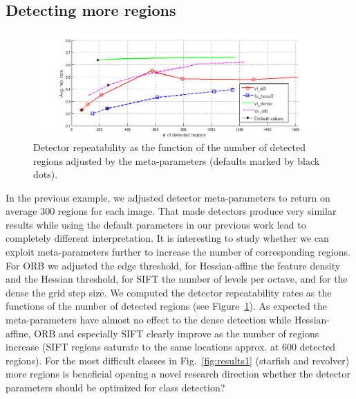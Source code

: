 \documentclass[review]{elsarticle}
\begin{document}
\subsection{Detecting more regions\label{sec:more_regions}}
%
\begin{figure}[h]
  \begin{center}
    \includegraphics[trim=60 0 40 0, clip=true, width=0.8\linewidth]{resources/antti_results/DetectingMoreRegions/DetectorPlot.png}
    \caption{Detector repeatability as the function of the number of
      detected regions adjusted by the meta-parameters (defaults
      marked by black dots).\label{fig:more_regions}}
  \end{center}
\end{figure}
%
In the previous example, we adjusted detector meta-parameters to
return on average 300 regions for each image. That made detectors
produce very similar results while using the default parameters in
our previous work lead to completely different interpretation. 
It is interesting to study whether we can exploit meta-parameters
further to increase the number of corresponding regions.
For ORB we adjusted the edge threshold, for
Hessian-affine the feature density and the Hessian threshold,
for SIFT the number of levels per octave, and for the dense
the grid step size.
We computed the detector repeatability rates as the functions of the
number of detected regions (see Figure~\ref{fig:more_regions}). As
expected the meta-parameters have almost no effect to the dense detection
while Hessian-affine, ORB and especially SIFT clearly improve as the
number of regions increase (SIFT regions saturate to the same
locations approx. at 600 detected regions). For the most difficult
classes in Fig.~\ref{fig:results1} (starfish and revolver) more
regions is beneficial opening a novel
research direction whether the detector parameters should be
optimized for class detection?
\end{document}
